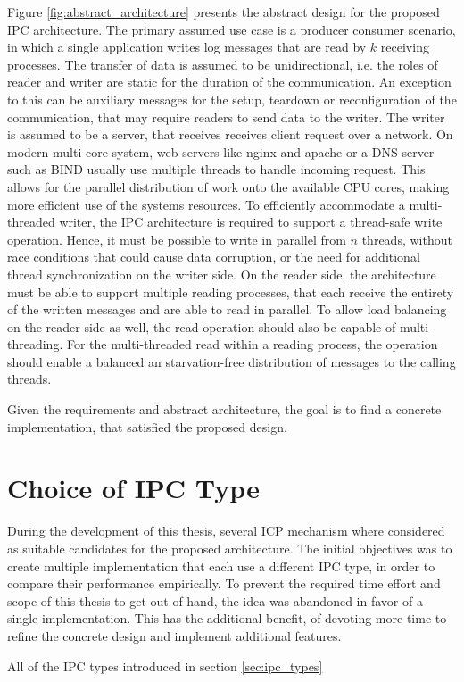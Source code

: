 Figure \ref{fig:abstract_architecture} presents the abstract design for the proposed \ac{IPC} architecture.
The primary assumed use case is a producer consumer scenario, in which a single application writes log messages that 
are read by $k$ receiving processes. The transfer of data is assumed to be unidirectional, i.e. the roles of reader and writer are static for the duration of the
communication. An exception to this can be auxiliary messages for the setup, teardown or reconfiguration of the communication, that may require readers to send
data to the writer. The writer is assumed to be a server, that receives receives client request over a network.
On modern multi-core system, web servers like nginx and apache or a DNS server such as BIND usually use multiple threads to handle incoming request.
This allows for the parallel distribution of work onto the available CPU cores, making more efficient use of the systems resources. To efficiently accommodate a 
multi-threaded writer, the \ac{IPC} architecture is required to support a thread-safe write operation. Hence, it must be possible to
write in parallel from $n$ threads, without race conditions that could cause data corruption, or the need for additional thread synchronization    
on the writer side. On the reader side, the architecture must be able to support multiple reading processes, that each receive the entirety
of the written messages and are able to read in parallel. To allow load balancing on the reader side as well, the read operation
should also be capable of multi-threading. For the multi-threaded read within a reading process, the operation should enable a balanced an starvation-free distribution 
of messages to the calling threads.  
\par
Given the requirements and abstract architecture, the goal is to find a concrete implementation, that satisfied the proposed design.


\section{Choice of IPC Type}

During the development of this thesis, several \ac{ICP} mechanism where considered as suitable candidates for the proposed architecture. The initial
objectives was to create multiple implementation that each use a different \ac{IPC} type, in order to compare their performance empirically. 
To prevent the required time effort and scope of this thesis to get out of hand, the idea was abandoned in favor of a single implementation.
This has the additional benefit, of devoting more time to refine the concrete design and implement additional features. 
\par
All of the \ac{IPC} types introduced in section \ref{sec:ipc_types} 

